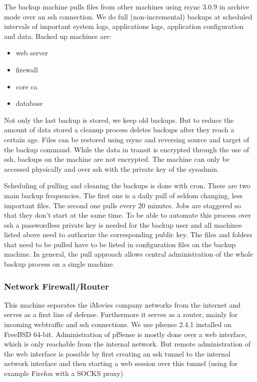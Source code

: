 \documentclass[english]{article}
\begin{document}
The backup machine pulls files from other machines using rsync 3.0.9 in archive mode over an ssh connection. We do full (non-incremental) backups at scheduled intervals of important system logs, applications logs, application configuration and data. Backed up machines are:

\begin{itemize}
    \item web server
    \item firewall
    \item core ca
    \item database
\end{itemize}

Not only the last backup is stored, we keep old backups. But to reduce the amount of data stored a cleanup process deletes backups after they reach a certain age. Files can be restored using rsync and reversing source and target of the backup command.
While the data in transit is encrypted through the use of ssh, backups on the machine are not encrypted. The machine can only be accessed physically and over ssh with the private key of the sysadmin.

Scheduling of pulling and cleaning the backups is done with cron. There are two main backup frequencies. The first one is a daily pull of seldom changing, less important files. The second one pulls every 20 minutes. Jobs are staggered so that they don't start at the same time. To be able to automate this process over ssh a passwordless private key is needed for the backup user and all machines listed above need to authorize the corresponding public key.
The files and folders that need to be pulled have to be listed in configuration files on the backup machine. In general, the pull approach allows central administration of the whole backup process on a single machine.




\subsubsection{Network Firewall/Router}

This machine separates the iMovies company networks from the internet and serves as a first line of defense. Furthermore it serves as a router, mainly for incoming webtraffic and ssh connections. We use pfsense 2.4.1 installed on FreeBSD 64-bit. Administration of pfSense is mostly done over a web interface, which is only reachable from the internal network. But remote administration of the web interface is possible by first creating an ssh tunnel to the internal network interface and then starting a web session over this tunnel (using for example Firefox with a SOCKS proxy)
\end{document}
